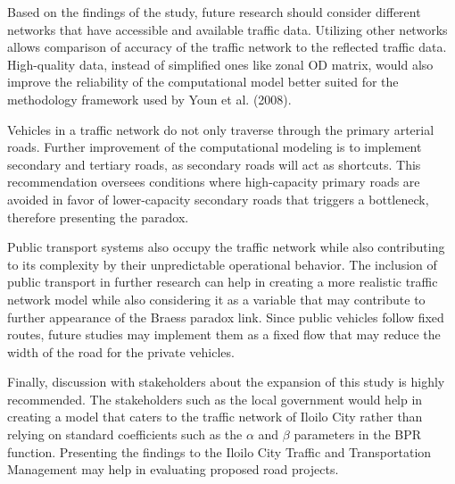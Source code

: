 Based on the findings of the study, future research should consider different networks that have accessible and available traffic data. Utilizing other networks allows comparison of accuracy of the traffic network to the reflected traffic data. High-quality data, instead of simplified ones like zonal OD matrix, would also improve the reliability of the computational model better suited for the methodology framework used by Youn et al. (2008).

Vehicles in a traffic network do not only traverse through the primary arterial roads. Further improvement of the computational modeling is to implement secondary and tertiary roads, as secondary roads will act as shortcuts. This recommendation oversees conditions where high-capacity primary roads are avoided in favor of lower-capacity secondary roads that triggers a bottleneck, therefore presenting the paradox. 

Public transport systems also occupy the traffic network while also contributing to its complexity by their unpredictable operational behavior. The inclusion of public transport in further research can help in creating a more realistic traffic network model while also considering it as a variable that may contribute to further appearance of the Braess paradox link. Since public vehicles follow fixed routes, future studies may implement them as a fixed flow that may reduce the width of the road for the private vehicles. 

Finally, discussion with stakeholders about the expansion of this study is highly recommended. The stakeholders such as the local government would help in creating a model that caters to the traffic network of Iloilo City rather than relying on standard coefficients such as the $\alpha$ and $\beta$ parameters in the BPR function. Presenting the findings to the Iloilo City Traffic and Transportation Management may help in evaluating proposed road projects.